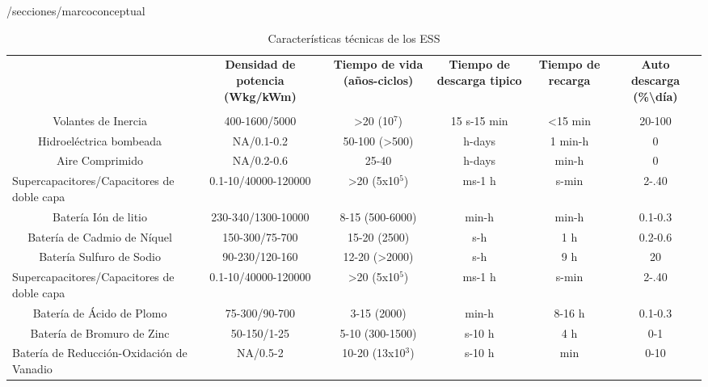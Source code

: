 \begin{table}[htbp]
  \centering
  \caption{Características técnicas de los ESS }/secciones/marcoconceptual
  \resizebox{17cm}{!} {
    \begin{tabular}{|p{13.855em}|c|c|c|c|c|}
    \rowcolor[rgb]{ .051,  .051,  .051} \multicolumn{1}{|c|}{\textcolor[rgb]{ 1,  1,  1}{\textbf{PARÁMETROS }}} & \multicolumn{1}{p{10.145em}|}{\textcolor[rgb]{ 1,  1,  1}{\textbf{Densidad de potencia (Wkg/kWm)}}} & \multicolumn{1}{p{8.57em}|}{\textcolor[rgb]{ 1,  1,  1}{\textbf{Tiempo de vida (años-ciclos) }}} & \multicolumn{1}{p{8.285em}|}{\textcolor[rgb]{ 1,  1,  1}{\textbf{Tiempo de descarga tipico}}} & \textcolor[rgb]{ 1,  1,  1}{\textbf{Tiempo de recarga }} & \multicolumn{1}{p{8.855em}|}{\textcolor[rgb]{ 1,  1,  1}{\textbf{Auto descarga (\%\textbackslash{}día)}}} \\
    \rowcolor[rgb]{ .051,  .051,  .051} \multicolumn{1}{|c|}{\textcolor[rgb]{ 1,  1,  1}{\textbf{TECNOLOGÍAS}}} & \textcolor[rgb]{ 1,  1,  1}{} & \textcolor[rgb]{ 1,  1,  1}{} & \textcolor[rgb]{ 1,  1,  1}{} & \textcolor[rgb]{ 1,  1,  1}{} & \textcolor[rgb]{ 1,  1,  1}{} \\
    \multicolumn{1}{|c|}{Volantes de Inercia} & 400-1600/5000 & >20 (10$^7$) & 15 s-15 min & <15 min & 20-100 \\
    \hline
     \multicolumn{1}{|c|}{Hidroeléctrica bombeada} & NA/0.1-0.2 & 50-100 (>500) & h-days & 1 min-h & 0 \\
    \hline
    \multicolumn{1}{|c|}{Aire Comprimido} & NA/0.2-0.6 & 25-40  & h-days & min-h & 0 \\
    \hline
     Supercapacitores/Capacitores de doble capa & 0.1-10/40000-120000 & >20 (5x10$^5$) & ms-1 h & s-min & 2-.40 \\
    \hline
    \multicolumn{1}{|c|}{Batería Ión de litio} & 230-340/1300-10000 & 8-15 (500-6000) & min-h & min-h & 0.1-0.3 \\
    \hline
     \multicolumn{1}{|c|}{Batería de Cadmio de Níquel} & 150-300/75-700 & 15-20 (2500) & s-h   & 1 h   & 0.2-0.6 \\
    \hline
    \multicolumn{1}{|c|}{Batería Sulfuro de Sodio} & 90-230/120-160 & 12-20 (>2000) & s-h   & 9 h   & 20 \\
    \hline
    Supercapacitores/Capacitores de doble capa & 0.1-10/40000-120000 & >20 (5x10$^5$) & ms-1 h & s-min & 2-.40 \\
    \hline
    \multicolumn{1}{|c|}{Batería de Ácido de Plomo} & 75-300/90-700 & 3-15 (2000) & min-h & 8-16 h & 0.1-0.3 \\
    \hline
     \multicolumn{1}{|c|}{Batería de Bromuro de Zinc} & 50-150/1-25 & 5-10 (300-1500) & s-10 h & 4 h   & 0-1 \\
    \hline
    Batería de Reducción-Oxidación de Vanadio & NA/0.5-2 & 10-20 (13x10$^3$) & s-10 h & min   & 0-10 \\
    \bottomrule
    \end{tabular}%
    }
  \label{tab:addlabel}%
\end{table}%
